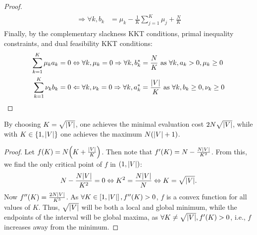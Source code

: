 \begin{proof}
\begin{align}
\begin{split}
        \Rightarrow \forall k, b_k &= \mu_k - \frac{1}{K} \sum_{j=1}^{K}{\mu_j} + \frac{N}{K}
    \end{split}
    \end{align}
    Finally, by the complementary slackness KKT conditions, primal inequality constraints, and dual feasibility KKT conditions:
    \begin{align}
    \begin{split}
        \sum_{k=1}^{K}{\mu_k a_k} &= 0 \Leftrightarrow \forall k, \mu_k = 0 \Rightarrow \forall k, b^*_k=\frac{N}{K} \text{ as $\forall k, a_k>0,\mu_k \geq 0$}\\
        \sum_{k=1}^{K}{\nu_k b_k} &= 0 \Leftarrow \forall k, \nu_k = 0 \Rightarrow \forall k, a^*_k = \frac{\mathopen{}\left|V\right|}{K} \text{ as $\forall k, b_k \geq 0,\nu_k \geq 0$}
    \end{split}
    \end{align}
    \end{proof}

\begin{lemma}
    \label{lemma:min_max_evaluation_cost}
    By choosing $K=\sqrt{\mathopen{}\left|V\right|}$, one achieves the minimal evaluation cost $2 N \sqrt{\mathopen{}\left|V\right|}$, while with $K \in \mathopen{}\left\{1, \mathopen{}\left|V\right|\right\}$ one achieves the maximum $N\mathopen{}\left(\mathopen{}\left|V\right| + 1\right)$.
\end{lemma}
\begin{proof}
    Let $f\mathopen{}\left(K\right) = N\mathopen{}\left(K + \frac{\mathopen{}\left|V\right|}{K}\right)$. Then note that $f'\mathopen{}\left(K\right) = N - \frac{N \mathopen{}\left|V\right|}{K^2}$. From this, we find the only critical point of $f$ in $\mathopen{}\left(1, \mathopen{}\left|V\right|\right)$: 
    \begin{equation}
    N - \frac{N \mathopen{}\left|V\right|}{K^2} = 0 \Leftrightarrow K^2 = \frac{N \mathopen{}\left|V\right|}{N} \Leftrightarrow K = \sqrt{\mathopen{}\left|V\right|}. 
    \end{equation}
    Now $f''\mathopen{}\left(K\right)=\frac{2 N \mathopen{}\left|V\right|}{K^3}$. As $\forall K \in \mathopen{}\left[1, \mathopen{}\left|V\right|\right], f''\mathopen{}\left(K\right) > 0$, $f$ is a convex function for all values of $K$. Thus, $\sqrt{\mathopen{}\left|V\right|}$ will be both a local and global minimum, while the endpoints of the interval will be global maxima, as $\forall K \neq \sqrt{\mathopen{}\left|V\right|}, f'\mathopen{}\left(K\right) > 0$, i.e., $f$ increases away from the minimum.
\end{proof}

